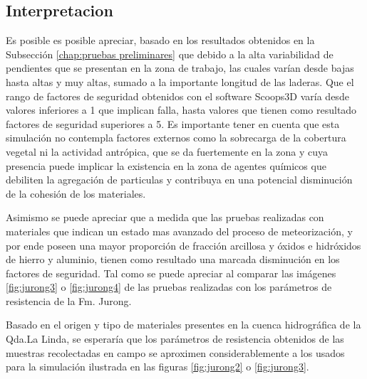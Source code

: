 \subsection{Interpretacion}
Es posible es posible apreciar, basado en los resultados obtenidos en la Subsecci\'on \ref{chap:pruebas preliminares} que debido a la alta variabilidad de pendientes que se presentan en la zona de trabajo, las cuales var\'ian desde bajas hasta altas y muy altas, sumado a la importante longitud de las laderas. Que el rango de factores de seguridad obtenidos con el software Scoops3D var\'ia desde valores inferiores a 1 que implican falla, hasta valores que tienen como resultado factores de seguridad superiores a 5.
Es importante tener en cuenta que esta simulaci\'on no contempla factores externos como la sobrecarga de la cobertura vegetal ni la actividad antr\'opica, que se da fuertemente en la zona y cuya presencia puede implicar la existencia en la zona de agentes qu\'imicos que debiliten la agregaci\'on de particulas y contribuya en una potencial disminuci\'on de la cohesi\'on de los materiales.

Asimismo se puede apreciar que a medida que las pruebas realizadas con materiales que indican un estado mas avanzado del proceso de meteorizaci\'on, y por ende poseen una mayor proporci\'on de fracci\'on arcillosa y \'oxidos e hidr\'oxidos de hierro y aluminio, tienen como resultado una marcada disminuci\'on en los factores de seguridad. Tal como se puede apreciar al comparar las im\'agenes \ref{fig:jurong3} o \ref{fig:jurong4} de las pruebas realizadas con los par\'ametros de resistencia de la Fm. Jurong.

Basado en el origen y tipo de materiales presentes en la cuenca hidrogr\'afica de la Qda.La Linda, se esperar\'ia que los par\'ametros de resistencia obtenidos de las muestras recolectadas en campo se aproximen considerablemente a los usados para la simulaci\'on ilustrada en las figuras \ref{fig:jurong2} o \ref{fig:jurong3}.  

